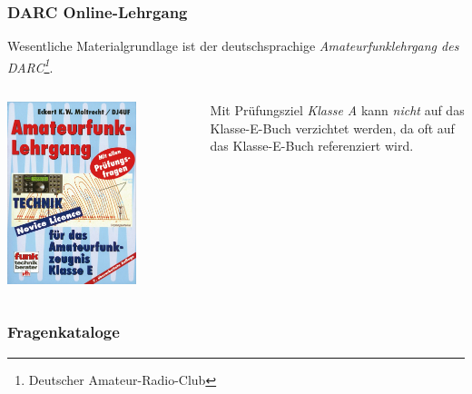 \begin{frame}
    \frametitle{DARC Online-Lehrgang}

    Wesentliche Materialgrundlage ist der deutschsprachige
    \emph{Amateurfunklehrgang \hyperlink{refs}{\cite{darc}} des
    DARC\footnote{Deutscher Amateur-Radio-Club}}.

    \begin{columns}[c]
        \column[c]{5cm}
        \begin{center}
            \includegraphics[width=0.7\textwidth]{e00/Amateurfunklehrgang-Technik-fuer-das-Amateurfunkzeugnis-Klasse-E.jpg}
            \tiny \hyperlink{refs}{\cite{darcv}}
        \end{center}
        \column{5cm}
        Mit Prüfungsziel \emph{Klasse A} kann \emph{nicht} auf das
        Klasse-E-Buch verzichtet werden, da oft auf das Klasse-E-Buch
        referenziert wird.
    \end{columns}

\end{frame}

\subsubsection{Fragenkataloge}


